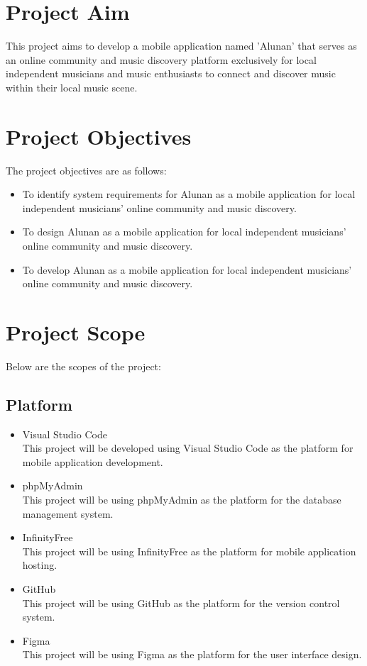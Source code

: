 \section{Project Aim}
This project aims to develop a mobile application named 'Alunan' that serves as an online community and music discovery platform exclusively for local independent musicians and music enthusiasts to connect and discover music within their local music scene.

\section{Project Objectives}
The project objectives are as follows:
\begin{itemize}
    \item To identify system requirements for Alunan as a mobile application for local independent musicians' online community and music discovery.
    \item To design Alunan as a mobile application for local independent musicians' online community and music discovery.
    \item To develop Alunan as a mobile application for local independent musicians' online community and music discovery.
\end{itemize}
\pagebreak

\section{Project Scope}
Below are the scopes of the project:

\subsection{Platform}
\begin{itemize}
    \item Visual Studio Code\\
    This project will be developed using Visual Studio Code as the platform for mobile application development.
    \item phpMyAdmin\\
    This project will be using phpMyAdmin as the platform for the database management system.
    \item InfinityFree\\
    This project will be using InfinityFree as the platform for mobile application hosting.
    \item GitHub\\
    This project will be using GitHub as the platform for the version control system.
    \item Figma\\
    This project will be using Figma as the platform for the user interface design.
\end{itemize}


